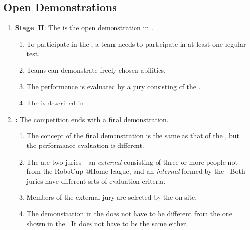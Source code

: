 \subsection{Open Demonstrations}
\label{sec:open-demonstrations}
\begin{enumerate}
	\item \textbf{Stage~II:} The  is the open demonstration in .
	\begin{enumerate}
		\item To participate in the , a team needs to participate in at least one regular  test.
		\item Teams can demonstrate freely chosen abilities. 
		\item The performance is evaluated by a jury consisting of the .
		\item The  is described in .
	\end{enumerate}

	
	\item \textbf{:} The competition ends with a final demonstration.
	\begin{enumerate}
		\item The concept of the final demonstration is the same as that of the , but the performance evaluation is different. 
		\item The are two juries---an \emph{external} consisting of three or more people not from the RoboCup @Home league, and an \emph{internal} formed by the . Both juries have different sets of evaluation criteria.
		\item Members of the external jury are selected by the  on site. 
		\item The demonstration in the  does not have to be different from the one shown in the . It does not have to be the same either.
	\end{enumerate}
\end{enumerate}


